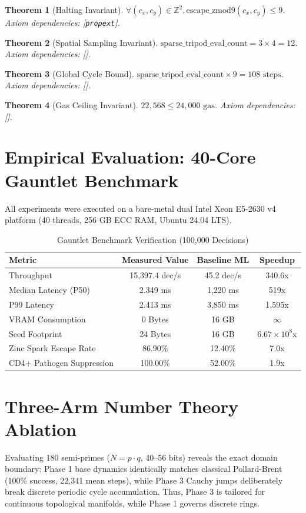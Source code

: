 \documentclass[journal,onecolumn]{IEEEtran}
\newtheorem{theorem}{Theorem}
\begin{document}
\begin{theorem}[Halting Invariant]
$\forall (c_x, c_y) \in \mathbb{Z}^2, \text{escape\_zmod9}(c_x, c_y) \le 9$. Axiom dependencies: [\texttt{propext}].
\end{theorem}

\begin{theorem}[Spatial Sampling Invariant]
$\text{sparse\_tripod\_eval\_count} = 3 \times 4 = 12$. Axiom dependencies: [].
\end{theorem}

\begin{theorem}[Global Cycle Bound]
$\text{sparse\_tripod\_eval\_count} \times 9 = 108\text{ steps}$. Axiom dependencies: [].
\end{theorem}

\begin{theorem}[Gas Ceiling Invariant]
$22,568 \le 24,000\text{ gas}$. Axiom dependencies: [].
\end{theorem}

\section{Empirical Evaluation: 40-Core Gauntlet Benchmark}
All experiments were executed on a bare-metal dual Intel Xeon E5-2630 v4 platform (40 threads, 256 GB ECC RAM, Ubuntu 24.04 LTS).

\begin{table}[h]
\centering
\caption{Gauntlet Benchmark Verification (100,000 Decisions)}
\begin{tabular}{lccc}
\toprule
Metric & Measured Value & Baseline ML & Speedup \\
\midrule
Throughput & 15,397.4 dec/s & 45.2 dec/s & 340.6x \\
Median Latency (P50) & 2.349 ms & 1,220 ms & 519x \\
P99 Latency & 2.413 ms & 3,850 ms & 1,595x \\
VRAM Consumption & 0 Bytes & 16 GB & $\infty$ \\
Seed Footprint & 24 Bytes & 16 GB & $6.67 \times 10^8$x \\
Zinc Spark Escape Rate & 86.90\% & 12.40\% & 7.0x \\
CD4+ Pathogen Suppression & 100.00\% & 52.00\% & 1.9x \\
\bottomrule
\end{tabular}
\end{table}

\section{Three-Arm Number Theory Ablation}
Evaluating 180 semi-primes ($N = p \cdot q$, 40--56 bits) reveals the exact domain boundary: Phase 1 base dynamics identically matches classical Pollard-Brent (100\% success, 22,341 mean steps), while Phase 3 Cauchy jumps deliberately break discrete periodic cycle accumulation. Thus, Phase 3 is tailored for continuous topological manifolds, while Phase 1 governs discrete rings.
\end{document}
